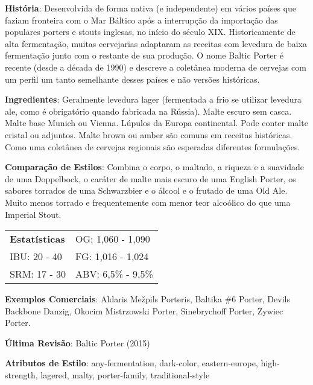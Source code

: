 \textbf{História}: Desenvolvida de forma nativa (e independente) em vários países que faziam fronteira com o Mar Báltico após a interrupção da importação das populares porters e stouts inglesas, no início do século XIX. Historicamente de alta fermentação, muitas cervejarias adaptaram as receitas com levedura de baixa fermentação junto com o restante de sua produção. O nome Baltic Porter é recente (desde a década de 1990) e descreve a coletânea moderna de cervejas com um perfil um tanto semelhante desses países e não versões históricas.

\textbf{Ingredientes}: Geralmente levedura lager (fermentada a frio se utilizar levedura ale, como é obrigatório quando fabricada na Rússia). Malte escuro sem casca. Malte base Munich ou Vienna. Lúpulos da Europa continental. Pode conter malte cristal ou adjuntos. Malte brown ou amber são comuns em receitas históricas. Como uma coletânea de cervejas regionais são esperadas diferentes formulações.

\textbf{Comparação de Estilos}: Combina o corpo, o maltado, a riqueza e a suavidade de uma Doppelbock, o caráter de malte mais escuro de uma English Porter, os sabores torrados de uma Schwarzbier e o álcool e o frutado de uma Old Ale. Muito menos torrado e frequentemente com menor teor alcoólico do que uma Imperial Stout.

\begin{tabular}{@{}p{35mm}p{35mm}@{}}
  \textbf{Estatísticas} & OG: 1,060 - 1,090 \\
  IBU: 20 - 40 & FG: 1,016 - 1,024 \\
  SRM: 17 - 30 & ABV: 6,5\% - 9,5\%
\end{tabular}

\textbf{Exemplos Comerciais}: Aldaris Mežpils Porteris, Baltika \#6 Porter, Devils Backbone Danzig, Okocim Mistrzowski Porter, Sinebrychoff Porter, Zywiec Porter.

\textbf{Última Revisão}: Baltic Porter (2015)

\textbf{Atributos de Estilo}: any-fermentation, dark-color, eastern-europe, high-strength, lagered, malty, porter-family, traditional-style

